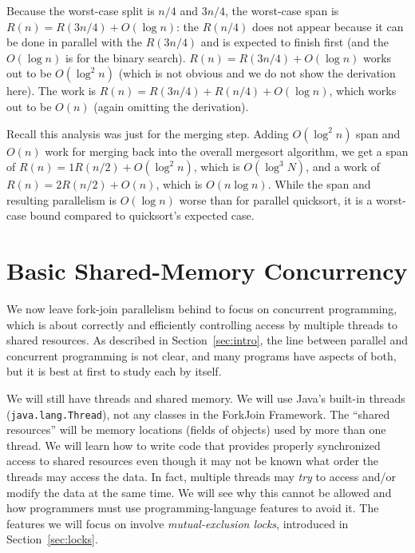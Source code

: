\documentclass[10pt]{article}
\begin{document}
Because the worst-case split is $n/4$ and $3n/4$, the worst-case span
is $R(n)=R(3n/4)+O(\log n)$: the $R(n/4)$ does not appear because it
can be done in parallel with the $R(3n/4)$ and is expected to finish
first (and the $O(\log n)$ is for the binary search).
$R(n)=R(3n/4)+O(\log n)$ works out to be $O(\log^2 n)$ (which is not
obvious and we do not show the derivation here).  The work is
$R(n)=R(3n/4)+R(n/4) + O(\log n)$, which works out to be $O(n)$ (again
omitting the derivation).

Recall this analysis was just for the merging step.  Adding $O(\log^2
n)$ span and $O(n)$ work for merging back into the overall mergesort
algorithm, we get a span of $R(n)=1R(n/2)+O(\log^2 n)$, which is
$O(\log^3 N)$, and a work of $R(n)=2R(n/2)+O(n)$, which is $O(n\log
n)$.  While the span and resulting parallelism is $O(\log n)$ worse
than for parallel quicksort, it is a worst-case bound compared to
quicksort's expected case.

\section{Basic Shared-Memory Concurrency}
\label{sec:basic-concurrency}

We now leave fork-join parallelism behind to focus on concurrent
programming, which is about correctly and efficiently controlling
access by multiple threads to shared resources.  As described in
Section~\ref{sec:intro}, the line between parallel and concurrent
programming is not clear, and many programs have aspects of both, but
it is best at first to study each by itself.

We will still have threads and shared memory.  We will use Java's
built-in threads ({\tt java.lang.Thread}), not any classes in the
ForkJoin Framework.  The ``shared resources'' will be memory locations
(fields of objects) used by more than one thread.  We will learn how
to write code that provides properly synchronized access to shared
resources even though it may not be known what order the threads may
access the data.  In fact, multiple threads may \emph{try} to access
and/or modify
the data at the same time.  We will see why this cannot be allowed and
how programmers must use programming-language features to avoid it.
The features we will focus on involve \emph{mutual-exclusion locks},
introduced in Section~\ref{sec:locks}.
\end{document}
